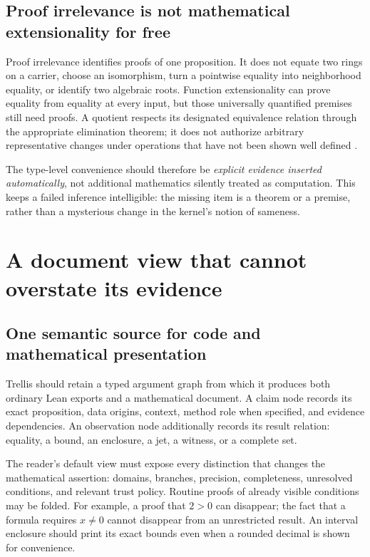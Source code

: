 \documentclass[11pt,a4paper]{article}
\theoremstyle{definition}
\theoremstyle{remark}
\begin{document}
\subsection{Proof irrelevance is not mathematical extensionality for free}
Proof irrelevance identifies proofs of one proposition. It does not equate two rings on a carrier, choose an isomorphism, turn a pointwise equality into neighborhood equality, or identify two algebraic roots. Function extensionality can prove equality from equality at every input, but those universally quantified premises still need proofs. A quotient respects its designated equivalence relation through the appropriate elimination theorem; it does not authorize arbitrary representative changes under operations that have not been shown well defined \cite{leanTypes,leanQuotients}.

The type-level convenience should therefore be \emph{explicit evidence inserted automatically}, not additional mathematics silently treated as computation. This keeps a failed inference intelligible: the missing item is a theorem or a premise, rather than a mysterious change in the kernel's notion of sameness.

\section{A document view that cannot overstate its evidence}
\label{sec:display}

\subsection{One semantic source for code and mathematical presentation}
Trellis should retain a typed argument graph from which it produces both ordinary Lean exports and a mathematical document. A claim node records its exact proposition, data origins, context, method role when specified, and evidence dependencies. An observation node additionally records its result relation: equality, a bound, an enclosure, a jet, a witness, or a complete set.

The reader's default view must expose every distinction that changes the mathematical assertion: domains, branches, precision, completeness, unresolved conditions, and relevant trust policy. Routine proofs of already visible conditions may be folded. For example, a proof that $2>0$ can disappear; the fact that a formula requires $x\ne0$ cannot disappear from an unrestricted result. An interval enclosure should print its exact bounds even when a rounded decimal is shown for convenience.
\end{document}
